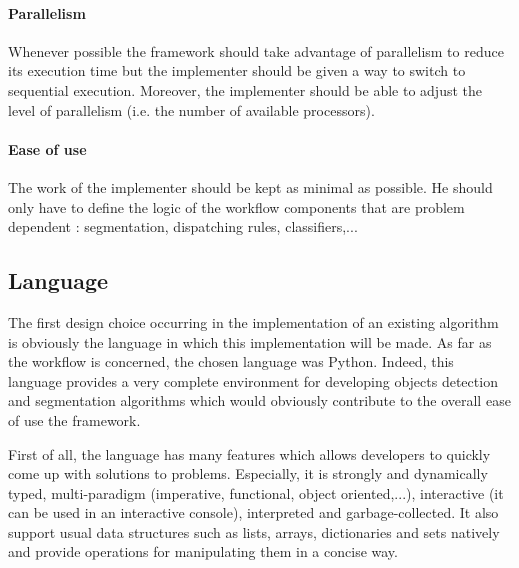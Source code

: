 \paragraph{Parallelism} Whenever possible the framework should take advantage of parallelism to reduce its execution time but the implementer should be given a way to switch to sequential execution. Moreover, the implementer should be able to adjust the level of parallelism (i.e. the number of available processors).

\paragraph{Ease of use} The work of the implementer should be kept as minimal as possible. He should only have to define the logic of the workflow components that are problem dependent : segmentation, dispatching rules, classifiers,... 

\subsection{Language}
\label{ssec:work_language}
The first design choice occurring in the implementation of an existing algorithm is obviously the language in which this implementation will be made. As far as the workflow is concerned, the chosen language was Python. Indeed, this language provides a very complete environment for developing objects detection and segmentation algorithms which would obviously contribute to the overall ease of use the framework. 

First of all, the language has many features which allows developers to quickly come up with solutions to problems. Especially, it is strongly and dynamically typed, multi-paradigm (imperative, functional, object oriented,...), interactive (it can be used in an interactive console), interpreted and garbage-collected. It also support usual data structures such as lists, arrays, dictionaries and sets natively and provide operations for manipulating them in a concise way. 

